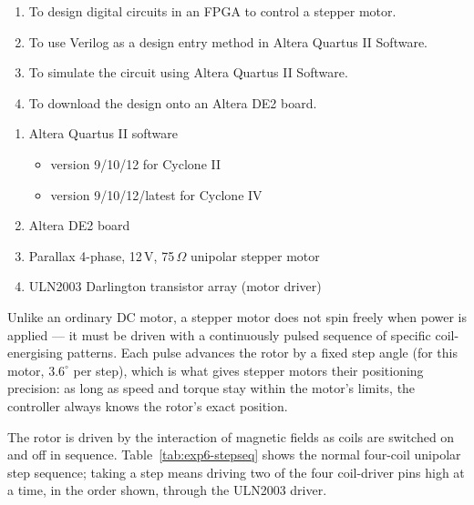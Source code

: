 
\begin{objectives}
  \begin{enumerate}
    \item To design digital circuits in an FPGA to control a stepper motor.
    \item To use Verilog as a design entry method in Altera Quartus II Software.
    \item To simulate the circuit using Altera Quartus II Software.
    \item To download the design onto an Altera DE2 board.
  \end{enumerate}
\end{objectives}

\begin{equipment}
  \begin{enumerate}
    \item Altera Quartus II software
          \begin{itemize}
            \item version 9/10/12 for Cyclone II
            \item version 9/10/12/latest for Cyclone IV
          \end{itemize}
    \item Altera DE2 board
    \item Parallax 4-phase, 12\,V, 75\,$\Omega$ unipolar stepper motor
    \item ULN2003 Darlington transistor array (motor driver)
  \end{enumerate}
\end{equipment}

\begin{introduction}
  Unlike an ordinary DC motor, a stepper motor does not spin freely when power is applied --- it must be driven with a continuously pulsed sequence of specific coil-energising patterns. Each pulse advances the rotor by a fixed step angle (for this motor, $3.6^\circ$ per step), which is what gives stepper motors their positioning precision: as long as speed and torque stay within the motor's limits, the controller always knows the rotor's exact position.
  \vspace*{1.5em}

  The rotor is driven by the interaction of magnetic fields as coils are switched on and off in sequence. Table~\ref{tab:exp6-stepseq} shows the normal four-coil unipolar step sequence; taking a step means driving two of the four coil-driver pins high at a time, in the order shown, through the ULN2003 driver.
\end{introduction}

